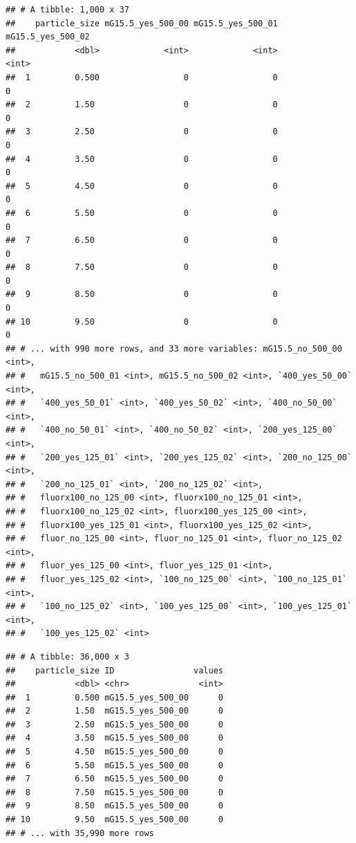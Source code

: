 \documentclass[10pt,letterpaper]{article}
\newenvironment{Shaded}{\begin{snugshade}}{\end{snugshade}}
\newcommand{\KeywordTok}[1]{\textcolor[rgb]{0.13,0.29,0.53}{\textbf{#1}}}
\newcommand{\DecValTok}[1]{\textcolor[rgb]{0.00,0.00,0.81}{#1}}
\newcommand{\StringTok}[1]{\textcolor[rgb]{0.31,0.60,0.02}{#1}}
\newcommand{\OperatorTok}[1]{\textcolor[rgb]{0.81,0.36,0.00}{\textbf{#1}}}
\newcommand{\NormalTok}[1]{#1}
\begin{document}
\begin{verbatim}
## # A tibble: 1,000 x 37
##    particle_size mG15.5_yes_500_00 mG15.5_yes_500_01 mG15.5_yes_500_02
##            <dbl>             <int>             <int>             <int>
##  1         0.500                 0                 0                 0
##  2         1.50                  0                 0                 0
##  3         2.50                  0                 0                 0
##  4         3.50                  0                 0                 0
##  5         4.50                  0                 0                 0
##  6         5.50                  0                 0                 0
##  7         6.50                  0                 0                 0
##  8         7.50                  0                 0                 0
##  9         8.50                  0                 0                 0
## 10         9.50                  0                 0                 0
## # ... with 990 more rows, and 33 more variables: mG15.5_no_500_00 <int>,
## #   mG15.5_no_500_01 <int>, mG15.5_no_500_02 <int>, `400_yes_50_00` <int>,
## #   `400_yes_50_01` <int>, `400_yes_50_02` <int>, `400_no_50_00` <int>,
## #   `400_no_50_01` <int>, `400_no_50_02` <int>, `200_yes_125_00` <int>,
## #   `200_yes_125_01` <int>, `200_yes_125_02` <int>, `200_no_125_00` <int>,
## #   `200_no_125_01` <int>, `200_no_125_02` <int>,
## #   fluorx100_no_125_00 <int>, fluorx100_no_125_01 <int>,
## #   fluorx100_no_125_02 <int>, fluorx100_yes_125_00 <int>,
## #   fluorx100_yes_125_01 <int>, fluorx100_yes_125_02 <int>,
## #   fluor_no_125_00 <int>, fluor_no_125_01 <int>, fluor_no_125_02 <int>,
## #   fluor_yes_125_00 <int>, fluor_yes_125_01 <int>,
## #   fluor_yes_125_02 <int>, `100_no_125_00` <int>, `100_no_125_01` <int>,
## #   `100_no_125_02` <int>, `100_yes_125_00` <int>, `100_yes_125_01` <int>,
## #   `100_yes_125_02` <int>
\end{verbatim}

\begin{Shaded}
\end{Shaded}

\begin{verbatim}
## # A tibble: 36,000 x 3
##    particle_size ID                values
##            <dbl> <chr>              <int>
##  1         0.500 mG15.5_yes_500_00      0
##  2         1.50  mG15.5_yes_500_00      0
##  3         2.50  mG15.5_yes_500_00      0
##  4         3.50  mG15.5_yes_500_00      0
##  5         4.50  mG15.5_yes_500_00      0
##  6         5.50  mG15.5_yes_500_00      0
##  7         6.50  mG15.5_yes_500_00      0
##  8         7.50  mG15.5_yes_500_00      0
##  9         8.50  mG15.5_yes_500_00      0
## 10         9.50  mG15.5_yes_500_00      0
## # ... with 35,990 more rows
\end{verbatim}
\end{document}
